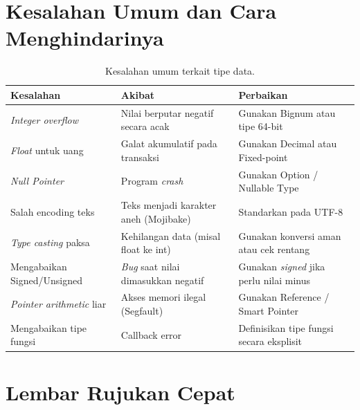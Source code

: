 \documentclass[11pt,a4paper]{article}
\begin{document}
	\section{Kesalahan Umum dan Cara Menghindarinya}
	
	\begin{table}[H]
		\centering
		\caption{Kesalahan umum terkait tipe data.}
		\label{tab:mistakes}
		\footnotesize
		\begin{tabularx}{\textwidth}{l X X}
			\toprule
			Kesalahan & Akibat & Perbaikan \\
			\midrule
			\textit{Integer overflow} & Nilai berputar negatif secara acak & Gunakan Bignum atau tipe 64-bit \\
			\textit{Float} untuk uang & Galat akumulatif pada transaksi & Gunakan Decimal atau Fixed-point \\
			\textit{Null Pointer} & Program \textit{crash} & Gunakan Option / Nullable Type \\
			Salah encoding teks & Teks menjadi karakter aneh (Mojibake) & Standarkan pada UTF-8 \\
			\textit{Type casting} paksa & Kehilangan data (misal float ke int) & Gunakan konversi aman atau cek rentang \\
			Mengabaikan Signed/Unsigned & \textit{Bug} saat nilai dimasukkan negatif & Gunakan \textit{signed} jika perlu nilai minus \\
			\textit{Pointer arithmetic} liar & Akses memori ilegal (Segfault) & Gunakan Reference / Smart Pointer \\
			Mengabaikan tipe fungsi & Callback error & Definisikan tipe fungsi secara eksplisit \\
			\bottomrule
		\end{tabularx}
	\end{table}
	
	\section{Lembar Rujukan Cepat}
	
\end{document}
